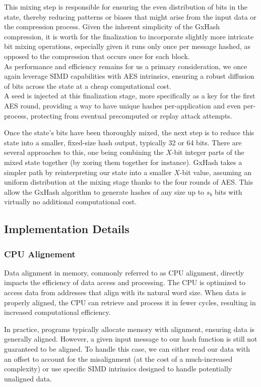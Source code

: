\documentclass[10pt]{article}
\begin{document}
This mixing step is responsible for ensuring the even distribution of bits in the state, thereby reducing patterns or biases that might arise from the input data or the compression process. Given the inherent simplicity of the GxHash compression, it is worth for the finalization to incorporate slightly more intricate bit mixing operations, especially given it runs only once per message hashed, as opposed to the compression that occurs once for each block.\\
As performance and efficiency remains for us a primary consideration, we once again leverage SIMD capabilities with AES intrinsics, ensuring a robust diffusion of bits across the state at a cheap computational cost.\\
A seed is injected at this finalization stage, more specifically as a key for the first AES round, providing a way to have unique hashes per-application and even per-process, protecting from eventual precomputed or replay attack attempts.

Once the state's bits have been thoroughly mixed, the next step is to reduce this state into a smaller, fixed-size hash output, typically 32 or 64 bits. There are several approaches to this, one being combining the \( X \)-bit integer parts of the mixed state together (by xoring them together for instance). GxHash takes a simpler path by reinterpreting our state into a smaller \( X \)-bit value, assuming an uniform distribution at the mixing stage thanks to the four rounds of AES. This allow the GxHash algorithm to generate hashes of any size up to \( s_b \) bits with virtually no additional computational cost.

\subsection{Implementation Details}

\subsubsection{CPU Alignement}

Data alignment in memory, commonly referred to as CPU alignment, directly impacts the efficiency of data access and processing. The CPU is optimized to access data from addresses that align with its natural word size. When data is properly aligned, the CPU can retrieve and process it in fewer cycles, resulting in increased computational efficiency.

In practice, programs typically allocate memory with alignment, ensuring data is generally aligned. However, a given input message to our hash function is still not guaranteed to be aligned. To handle this case, we can either read our data with an offset to account for the misalignment (at the cost of a much-increased complexity) or use specific SIMD intrinsics designed to handle potentially unaligned data. 
\end{document}
